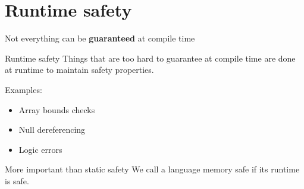 \documentclass[compress,12pt,xcolor={dvipsnames}]{beamer}
\begin{document}
\section{Runtime safety}

\begin{frame}[standout]
    \centering\large
    Not everything can be \textbf{guaranteed} at compile time
\end{frame}

\begin{frame}{Runtime safety}
    Things that are too hard to guarantee at compile time are done at runtime to maintain safety properties.

    Examples:

    \begin{itemize}
        \item Array bounds checks
        \item Null dereferencing
        \item Logic errors 
    \end{itemize}
\end{frame}

\begin{frame}{More important than static safety}
    We call a language memory safe if its runtime is safe.

\end{frame}
\end{document}
